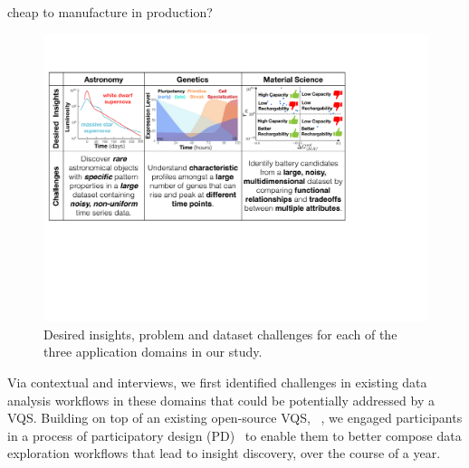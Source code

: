  cheap to manufacture in production?
 \begin{figure}[ht!]
 	\centering
 	\includegraphics[width=\linewidth]{figures/science_goal.pdf}
 	\caption{Desired insights, problem and dataset challenges for each of the three application domains in our study.}
 	\label{science_goal}
 	\vspace*{-15pt}
 \end{figure}
 \par Via contextual  and interviews, we first identified challenges in existing data analysis workflows in these domains
 that could be potentially addressed by a VQS. Building on top of an existing open-source VQS, \zv~\cite{Siddiqui2017,Siddiqui2017VLDB}, we engaged participants in a process of participatory design (PD)~\cite{Muller1993,BodkerGronbaek,HoltzblattJones} to enable them to better compose data exploration workflows that lead to insight discovery, over the course of a year.  %
